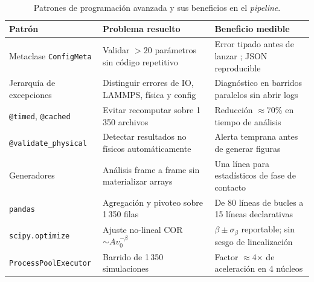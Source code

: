 \begin{table}[ht]
    \centering
    \small
    \caption{Patrones de programación avanzada y sus beneficios en el
    \textit{pipeline}.}
    \label{tab:patrones}
    \begin{tabular}{p{3.2cm} p{4.0cm} p{4.5cm}}
        \toprule
        Patrón & Problema resuelto & Beneficio medible \\
        \midrule
        Metaclase \texttt{ConfigMeta} &
            Validar $>20$ parámetros sin código repetitivo &
            Error tipado antes de lanzar \lammps{}; JSON reproducible \\[4pt]
        Jerarquía de excepciones &
            Distinguir errores de IO, LAMMPS, física y config &
            Diagnóstico en barridos paralelos sin abrir logs \\[4pt]
        \texttt{@timed}, \texttt{@cached} &
            Evitar recomputar sobre 1\,350 archivos &
            Reducción $\approx$70\% en tiempo de análisis \\[4pt]
        \texttt{@validate\_physical} &
            Detectar resultados no físicos automáticamente &
            Alerta temprana antes de generar figuras \\[4pt]
        Generadores &
            Análisis frame a frame sin materializar arrays &
            Una línea para estadísticos de fase de contacto \\[4pt]
        \texttt{pandas} &
            Agregación y pivoteo sobre 1\,350 filas &
            De 80 líneas de bucles a 15 líneas declarativas \\[4pt]
        \texttt{scipy.optimize} &
            Ajuste no-lineal COR$\sim Av_0^{-\beta}$ &
            $\beta \pm \sigma_\beta$ reportable; sin sesgo de linealización \\[4pt]
        \texttt{ProcessPoolExecutor} &
            Barrido de 1\,350 simulaciones &
            Factor $\approx$4$\times$ de aceleración en 4 núcleos \\
        \bottomrule
    \end{tabular}
\end{table}
